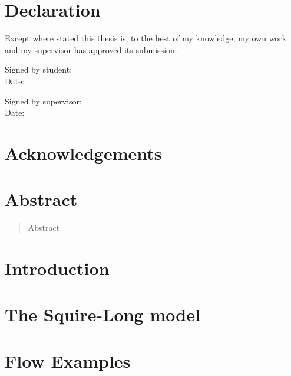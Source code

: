 \documentclass{X:/Documents/Coding/Latex/myreport}
\theoremstyle{plain}
\theoremstyle{definition}
\theoremstyle{remark}
\numberwithin{equation}{section}
\numberwithin{figure}{section}
\begin{document}
%
%

\chapter*{Declaration}

Except where stated this thesis is, to  the best of my knowledge,  my own work and my supervisor has approved its submission.

\vspace{20 pt}

\begin{flushleft}
Signed by student:  \\[15 pt]
Date:
\end{flushleft}

\vspace{20 pt}
\begin{flushleft}
Signed  by supervisor:\\[15 pt]
Date:
\end{flushleft}


\chapter*{Acknowledgements}

\chapter*{Abstract}

\begin{abstract}
	Abstract
\end{abstract}

\tableofcontents

%
%
\chapter{Introduction}


\chapter{The Squire-Long model}
%

\chapter{Flow Examples}
\end{document}
